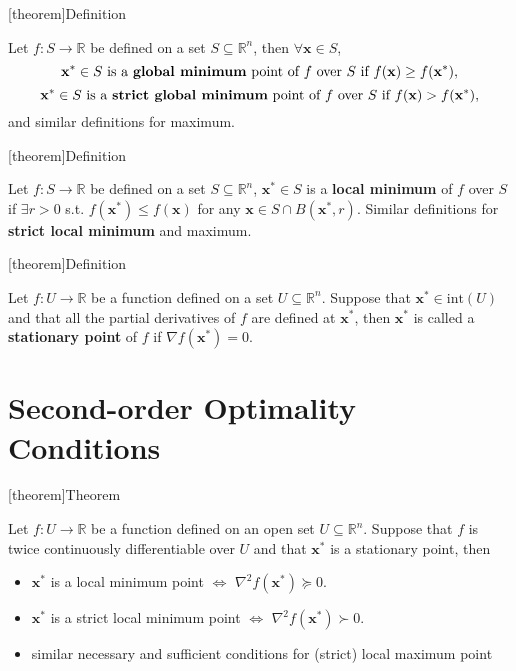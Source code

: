 \documentclass[12pt]{report}
\theoremstyle{definition}
\begin{document}
[theorem]{Definition}
\begin{global optimum}
    Let $f:S\rightarrow\mathbb{R}$ be defined on a set
    $S\subseteq\mathbb{R}^{n}$, then $\forall \mathbf{x}\in S$,
    \[
        \mathbf{x}^* \in S \text{ is a \textbf{global minimum} point of $f$ over
        $S$ if $f(\mathbf{x})\ge f(\mathbf{x}^*)$},
    \]
    \[
        \mathbf{x}^* \in S \text{ is a \textbf{strict global minimum} point of $f$ over
        $S$ if $f(\mathbf{x})> f(\mathbf{x}^*)$},
    \]
    and similar definitions for maximum.
\end{global optimum}

[theorem]{Definition}
\begin{local optimum}
    Let $f:S\rightarrow\mathbb{R}$ be defined on a set
    $S\subseteq\mathbb{R}^{n}$, $\mathbf{x}^*\in S$ 
    is a \textbf{local minimum} of $f$ over $S$ if
    $\exists r>0$ s.t. $f(\mathbf{x}^*)\le f(\mathbf{x})$ 
    for any $\mathbf{x}\in S\cap B(\mathbf{x}^*,r)$.
    Similar definitions for \textbf{strict local minimum} and maximum.
\end{local optimum}

[theorem]{Definition}
\begin{stationary points}
    Let $f:U\rightarrow\mathbb{R}$ be a function defined on a set
    $U\subseteq\mathbb{R}^{n}$.
    Suppose that $\mathbf{x}^*\in\text{int}(U)$ and that all the partial
    derivatives of $f$ are defined at $\mathbf{x}^*$, then $\mathbf{x}^*$ is
    called a \textbf{stationary point} of $f$ if $\nabla f(\mathbf{x}^*)=0$.
\end{stationary points}

\section{Second-order Optimality Conditions}

[theorem]{Theorem}
\begin{second-order optimality conditions}
    Let $f:U\rightarrow\mathbb{R}$ be a function defined on an open set
    $U\subseteq\mathbb{R}^{n}$. Suppose that $f$ is twice continuously
    differentiable over $U$ and that $\mathbf{x}^*$ is a stationary point, then
    \begin{itemize}
        \item $\mathbf{x}^*$ is a local minimum point $\iff$
            $\nabla^2f(\mathbf{x}^*)\succeq 0$.
        \item $\mathbf{x}^*$ is a strict local minimum point $\iff$
            $\nabla^2f(\mathbf{x}^*)\succ 0$.
        \item similar necessary and sufficient conditions for (strict) local
            maximum point
    \end{itemize} 
\end{second-order optimality conditions}
\end{document}
